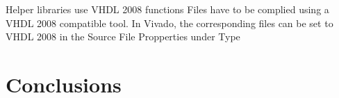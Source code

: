 \begin{refsection}
Helper libraries use VHDL 2008 functions
Files have to be complied using a VHDL 2008 compatible tool. In Vivado, the corresponding files can be set to VHDL 2008 in the Source File Propperties under Type 



\section{Conclusions}

\printbibliography[heading=subbibliography]
\end{refsection}
